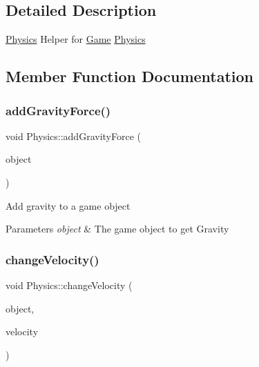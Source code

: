 \subsection{Detailed Description}
\mbox{\hyperlink{class_physics}{Physics}} Helper for \mbox{\hyperlink{class_game}{Game}} \mbox{\hyperlink{class_physics}{Physics}} 



\subsection{Member Function Documentation}
\mbox{\label{class_physics_a00639bda7da3c9e8c8b726de6104c64d}} 
\subsubsection{\texorpdfstring{add\+Gravity\+Force()}{addGravityForce()}}
{\footnotesize\ttfamily void Physics\+::add\+Gravity\+Force (\begin{DoxyParamCaption}\item[{shared\+\_\+ptr$<$ \mbox{\hyperlink{class_game_object}{Game\+Object}} $>$}]{object }\end{DoxyParamCaption})}



Add gravity to a game object 


\begin{DoxyParams}{Parameters}
{\em object} & The game object to get Gravity\\
\hline
\end{DoxyParams}
\mbox{\label{class_physics_a3baa430406c9017c1de92ed9c35dc9a2}} 
\subsubsection{\texorpdfstring{change\+Velocity()}{changeVelocity()}}
{\footnotesize\ttfamily void Physics\+::change\+Velocity (\begin{DoxyParamCaption}\item[{shared\+\_\+ptr$<$ \mbox{\hyperlink{class_game_object}{Game\+Object}} $>$}]{object,  }\item[{\mbox{\hyperlink{struct_vec2}{Vec2}}}]{velocity }\end{DoxyParamCaption})}



